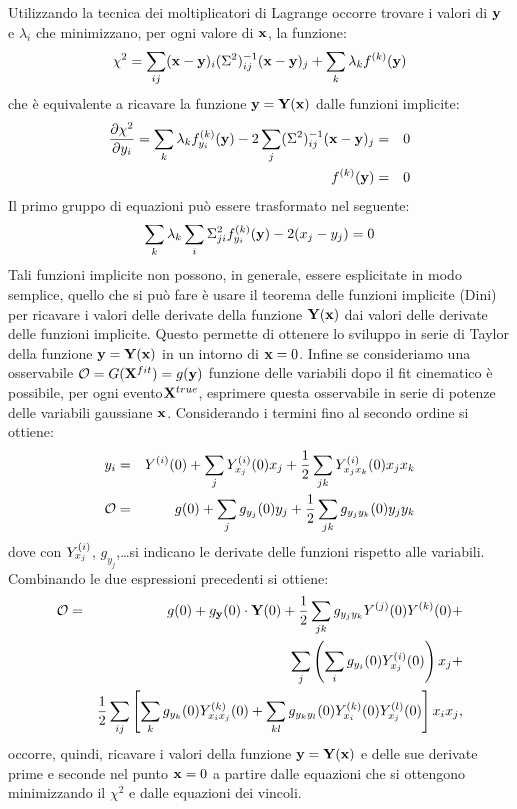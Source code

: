 Utilizzando la tecnica dei moltiplicatori di Lagrange occorre trovare i valori
di ${\bf y}$ e $\lambda_i$ che minimizzano,
per ogni valore di ${\bf x}$, la funzione:
\[\chi^2=\sum_{ij}({\bf x}-{\bf y})_i(\Sigma^2)^{-1}_{ij}({\bf x}-{\bf y})_j+\sum_k\lambda_kf^{(k)}({\bf y})\]
che \`e equivalente a ricavare la funzione ${\bf y}={{\bf Y}}({\bf x})$ dalle funzioni
implicite:
\begin{eqnarray*}
\frac{\partial\chi^2}{\partial y_i}=\sum_k\lambda_kf^{(k)}_{y_i}({\bf y})-2\sum_j(\Sigma^2)^{-1}_{ij}({\bf x}-{\bf y})_j&=&0\\f^{(k)}({\bf y})&=&0
\end{eqnarray*}
Il primo gruppo di equazioni pu\`o essere trasformato nel seguente:
\[\sum_k\lambda_k\sum_i\Sigma^2_{ji}f^{(k)}_{y_i}({\bf y})-2(x_j-y_j)=0\]
Tali funzioni implicite non possono, in generale, essere esplicitate in modo semplice, quello che si pu\`o fare \`e usare il teorema delle funzioni implicite
(Dini) per ricavare i valori delle derivate della funzione ${\bf Y}({\bf x})$ dai valori delle derivate delle funzioni implicite. Questo permette di ottenere
lo sviluppo in serie di Taylor della funzione ${\bf y}={\bf Y}({\bf x})$ in un intorno
di ${\bf x}=0$. Infine se consideriamo una osservabile ${\cal O}=G({\bf X}^{fit})=g({\bf y})$ funzione delle variabili dopo il fit cinematico \`e possibile, per ogni evento${\bf X}^{true}$, esprimere questa osservabile in serie di potenze delle variabili
gaussiane ${\bf x}$. Considerando i termini fino al secondo ordine si ottiene:
\begin{eqnarray}
\label{yfromx}y_i&=&Y^{(i)}(0)+\sum_jY^{(i)}_{x_j}(0)x_j+\frac{1}{2}\sum_{jk}Y^{(i)}_{x_jx_k}(0)x_jx_k\\
\label{obsfromx}{\cal O}&=&g(0)+\sum_jg_{y_j}(0)y_j+\frac{1}{2}\sum_{jk}g_{y_jy_k}(0)y_jy_k 
\end{eqnarray}
dove con $Y^{(i)}_{x_j}$, $g_{y_j}$,\dots si indicano le derivate delle funzioni
rispetto alle variabili. Combinando le due espressioni precedenti si ottiene:
\begin{eqnarray}
\label{ztayl}{\cal O}&=&g(0)+g_{{\bf y}}(0)\cdot{\bf Y}(0)+\frac{1}{2}\sum_{jk}g_{y_jy_k}Y^{(j)}(0)Y^{(k)}(0)+\nonumber\\
&&\sum_j\left(\sum_ig_{y_i}(0)Y^{(i)}_{x_j}(0)\right)x_j+\nonumber\\
&&\frac{1}{2}\sum_{ij}\left[\sum_k g_{y_k}(0)Y^{(k)}_{x_ix_j}(0)+\sum_{kl}g_{y_ky_l}(0)Y^{(k)}_{x_i}(0)Y^{(l)}_{x_j}(0)\right]x_ix_j,
\end{eqnarray}
occorre, quindi, ricavare i valori della funzione ${\bf y}={\bf Y}({\bf x})$ e delle sue
derivate prime e seconde nel punto ${\bf x}=0$ a partire dalle equazioni che si ottengono minimizzando il $\chi^2$ e dalle equazioni dei vincoli.
%
